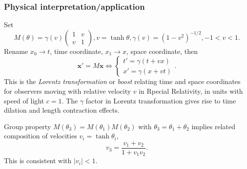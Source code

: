 \documentclass[a4paper]{article}
\begin{document}
    \subsubsection*{Physical interpretation/application}
    Set
    \[
      M(\theta)=\gamma(v)
      \begin{pmatrix}
        1&v\\
        v&1
      \end{pmatrix}, v=\tanh \theta,\gamma(v)=(1-v^2)^{-1/2}, -1<v<1.
    \]
    Rename $ x_0 \to t $, time coordinate, $ x_1 \to x $, space coordinate, then
    \[
      \mathbf{x}'=M\mathbf{x} \Longleftrightarrow \left\{
        \begin{aligned}
          t'=\gamma(t+vx)\\
          x'=\gamma(x+vt)
        \end{aligned} \right. .
      \]
      This is the \textit{Lorentz transformation} or \textit{boost}
      relating time and space coordinates for observers moving with
      relative velocity $v$ in Rpecial Relativity, in units with
      speed of light $c=1$. The $ \gamma $ factor in Lorentz
      transformation gives rise to time dilation and length contraction effects.

      Group property $ M(\theta_3)=M(\theta_1)M(\theta_2) $ with $
      \theta_3=\theta_1+\theta_2 $ implies related composition of
      velocities $ v_i=\tanh \theta_i $,
      \[
        v_3=\frac{v_1+v_2}{1+v_1v_2}.
      \]
      This is consistent with $|v_i|<1$.
      
\end{document}
